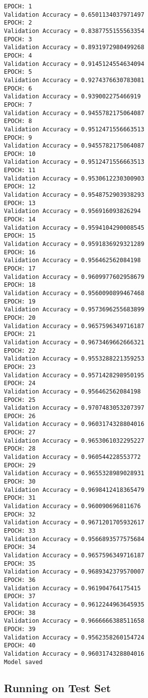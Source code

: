 \documentclass[11pt]{article}
\begin{document}
    \begin{Verbatim}[commandchars=\\\{\}]
EPOCH: 1
Validation Accuracy = 0.6501134037971497
EPOCH: 2
Validation Accuracy = 0.8387755155563354
EPOCH: 3
Validation Accuracy = 0.8931972980499268
EPOCH: 4
Validation Accuracy = 0.9145124554634094
EPOCH: 5
Validation Accuracy = 0.9274376630783081
EPOCH: 6
Validation Accuracy = 0.939002275466919
EPOCH: 7
Validation Accuracy = 0.9455782175064087
EPOCH: 8
Validation Accuracy = 0.9512471556663513
EPOCH: 9
Validation Accuracy = 0.9455782175064087
EPOCH: 10
Validation Accuracy = 0.9512471556663513
EPOCH: 11
Validation Accuracy = 0.9530612230300903
EPOCH: 12
Validation Accuracy = 0.9548752903938293
EPOCH: 13
Validation Accuracy = 0.956916093826294
EPOCH: 14
Validation Accuracy = 0.9594104290008545
EPOCH: 15
Validation Accuracy = 0.9591836929321289
EPOCH: 16
Validation Accuracy = 0.956462562084198
EPOCH: 17
Validation Accuracy = 0.9609977602958679
EPOCH: 18
Validation Accuracy = 0.9560090899467468
EPOCH: 19
Validation Accuracy = 0.9573696255683899
EPOCH: 20
Validation Accuracy = 0.9657596349716187
EPOCH: 21
Validation Accuracy = 0.9673469662666321
EPOCH: 22
Validation Accuracy = 0.9553288221359253
EPOCH: 23
Validation Accuracy = 0.9571428298950195
EPOCH: 24
Validation Accuracy = 0.956462562084198
EPOCH: 25
Validation Accuracy = 0.9707483053207397
EPOCH: 26
Validation Accuracy = 0.9603174328804016
EPOCH: 27
Validation Accuracy = 0.9653061032295227
EPOCH: 28
Validation Accuracy = 0.960544228553772
EPOCH: 29
Validation Accuracy = 0.9655328989028931
EPOCH: 30
Validation Accuracy = 0.9698412418365479
EPOCH: 31
Validation Accuracy = 0.960090696811676
EPOCH: 32
Validation Accuracy = 0.9671201705932617
EPOCH: 33
Validation Accuracy = 0.9566893577575684
EPOCH: 34
Validation Accuracy = 0.9657596349716187
EPOCH: 35
Validation Accuracy = 0.9689342379570007
EPOCH: 36
Validation Accuracy = 0.961904764175415
EPOCH: 37
Validation Accuracy = 0.9612244963645935
EPOCH: 38
Validation Accuracy = 0.9666666388511658
EPOCH: 39
Validation Accuracy = 0.9562358260154724
EPOCH: 40
Validation Accuracy = 0.9603174328804016
Model saved

    \end{Verbatim}

    \hypertarget{running-on-test-set}{%
\subsection{Running on Test Set}\label{running-on-test-set}}
\end{document}
